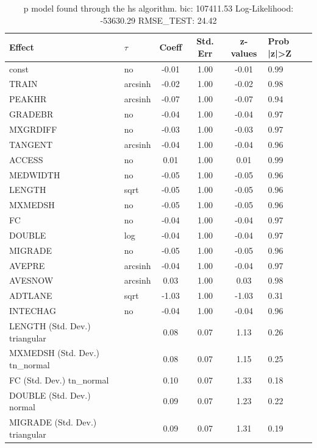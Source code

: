 \begin{table}
	\caption{p model found through the hs algorithm. bic: 107411.53 Log-Likelihood: -53630.29 RMSE_TEST: 24.42}
	\begin{center}
		\begin{tabular}{|l|l|c|c|c|l|}
			\hline
			Effect & $\tau$ & Coeff & Std. Err & z-values & Prob |z|>Z \\
			\hline
			const & no & -0.01 & 1.00 & -0.01 & 0.99 \\
			\hline
			TRAIN & arcsinh & -0.02 & 1.00 & -0.02 & 0.98 \\
			\hline
			PEAKHR & arcsinh & -0.07 & 1.00 & -0.07 & 0.94 \\
			\hline
			GRADEBR & no & -0.04 & 1.00 & -0.04 & 0.97 \\
			\hline
			MXGRDIFF & no & -0.03 & 1.00 & -0.03 & 0.97 \\
			\hline
			TANGENT & arcsinh & -0.04 & 1.00 & -0.04 & 0.96 \\
			\hline
			ACCESS & no & 0.01 & 1.00 & 0.01 & 0.99 \\
			\hline
			MEDWIDTH & no & -0.05 & 1.00 & -0.05 & 0.96 \\
			\hline
			LENGTH & sqrt & -0.05 & 1.00 & -0.05 & 0.96 \\
			\hline
			MXMEDSH & no & -0.05 & 1.00 & -0.05 & 0.96 \\
			\hline
			FC & no & -0.04 & 1.00 & -0.04 & 0.97 \\
			\hline
			DOUBLE & log & -0.04 & 1.00 & -0.04 & 0.97 \\
			\hline
			MIGRADE & no & -0.05 & 1.00 & -0.05 & 0.96 \\
			\hline
			AVEPRE & arcsinh & -0.04 & 1.00 & -0.04 & 0.97 \\
			\hline
			AVESNOW & arcsinh & 0.03 & 1.00 & 0.03 & 0.98 \\
			\hline
			ADTLANE & sqrt & -1.03 & 1.00 & -1.03 & 0.31 \\
			\hline
			INTECHAG & no & -0.04 & 1.00 & -0.04 & 0.96 \\
			\hline
			LENGTH (Std. Dev.) triangular &  & 0.08 & 0.07 & 1.13 & 0.26 \\
			\hline
			MXMEDSH (Std. Dev.) tn_normal &  & 0.08 & 0.07 & 1.15 & 0.25 \\
			\hline
			FC (Std. Dev.) tn_normal &  & 0.10 & 0.07 & 1.33 & 0.18 \\
			\hline
			DOUBLE (Std. Dev.) normal &  & 0.09 & 0.07 & 1.23 & 0.22 \\
			\hline
			MIGRADE (Std. Dev.) triangular &  & 0.09 & 0.07 & 1.31 & 0.19 \\

\end{tabular}
\end{center}
\end{table}
